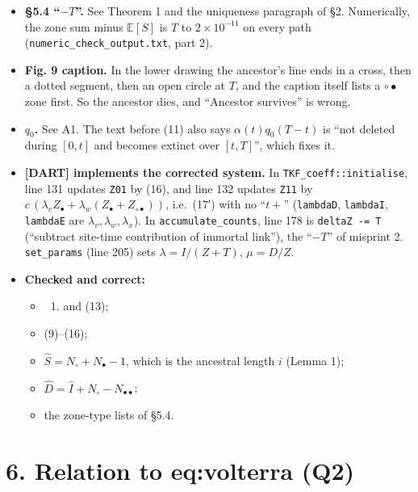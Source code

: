\documentclass[10pt,]{article}
\providecommand{\tightlist}{%
  \setlength{\itemsep}{0pt}\setlength{\parskip}{0pt}}
\begin{document}
\begin{itemize}
\tightlist
\item
  \textbf{§5.4 ``\(-T\)''.} See Theorem 1 and the uniqueness paragraph
  of §2. Numerically, the zone sum minus \(\mathbb E[S]\) is \(T\) to
  \(2\times10^{-11}\) on every path
  (\texttt{numeric\_check\_output.txt}, part 2).
\item
  \textbf{Fig. 9 caption.} In the lower drawing the ancestor's line ends
  in a cross, then a dotted segment, then an open circle at \(T\), and
  the caption itself lists a \(\circ\bullet\) zone first. So the
  ancestor dies, and ``Ancestor survives'' is wrong.
\item
  \textbf{\(q_0\).} See A1. The text before (11) also says
  \(\alpha(t)q_0(T-t)\) is ``not deleted during \([0,t]\) and becomes
  extinct over \([t,T]\)'', which fixes it.
\item
  \textbf{{[}DART{]} implements the corrected system.} In
  \texttt{TKF\_coeff::initialise}, line 131 updates \texttt{Z01} by
  (16), and line 132 updates \texttt{Z11} by
  \(c\,(\lambda_vZ_\bullet+\lambda_w(Z_\bullet+Z_{\circ\bullet}))\),
  i.e.~(17′) with no ``\(t+\)'' (\texttt{lambdaD}, \texttt{lambdaI},
  \texttt{lambdaE} are \(\lambda_v,\lambda_w,\lambda_x\)). In
  \texttt{accumulate\_counts}, line 178 is \texttt{deltaZ\ -=\ T}
  (``subtract site-time contribution of immortal link''), the ``\(-T\)''
  of misprint 2. \texttt{set\_params} (line 205) sets
  \(\lambda=I/(Z+T)\), \(\mu=D/Z\).
\item
  \textbf{Checked and correct:}

  \begin{itemize}
  \item
    \begin{enumerate}
    \def\labelenumi{(\arabic{enumi})}
    \setcounter{enumi}{7}
    \tightlist
    \item
      and (13);
    \end{enumerate}
  \item
    (9)--(16);
  \item
    \(\hat S=N_\circ+N_\bullet-1\), which is the ancestral length \(i\)
    (Lemma 1);
  \item
    \(\hat D=\hat I+N_\circ-N_{\bullet\bullet}\);
  \item
    the zone-type lists of §5.4.
  \end{itemize}
\end{itemize}

\hypertarget{relation-to-eqvolterra-q2}{%
\section{6. Relation to eq:volterra
(Q2)}\label{relation-to-eqvolterra-q2}}
\end{document}
